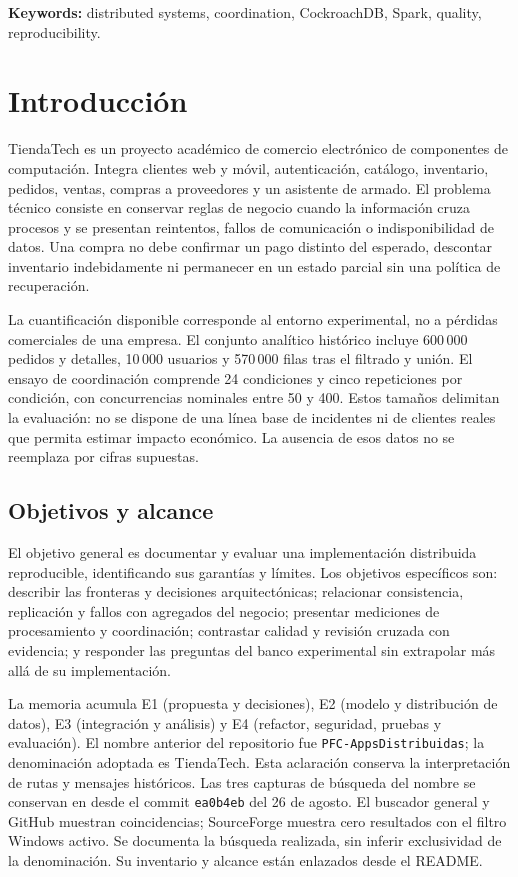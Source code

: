 \documentclass[12pt,a4paper]{article}
\begin{document}
\textbf{Keywords:} distributed systems, coordination, CockroachDB, Spark, quality, reproducibility.
\clearpage{}
\section{Introducción}
TiendaTech es un proyecto académico de comercio electrónico de componentes de computación. Integra clientes web y móvil, autenticación, catálogo, inventario, pedidos, ventas, compras a proveedores y un asistente de armado. El problema técnico consiste en conservar reglas de negocio cuando la información cruza procesos y se presentan reintentos, fallos de comunicación o indisponibilidad de datos. Una compra no debe confirmar un pago distinto del esperado, descontar inventario indebidamente ni permanecer en un estado parcial sin una política de recuperación.

La cuantificación disponible corresponde al entorno experimental, no a pérdidas comerciales de una empresa. El conjunto analítico histórico incluye 600\,000 pedidos y detalles, 10\,000 usuarios y 570\,000 filas tras el filtrado y unión. El ensayo de coordinación comprende 24 condiciones y cinco repeticiones por condición, con concurrencias nominales entre 50 y 400. Estos tamaños delimitan la evaluación: no se dispone de una línea base de incidentes ni de clientes reales que permita estimar impacto económico. La ausencia de esos datos no se reemplaza por cifras supuestas.

\subsection{Objetivos y alcance}
El objetivo general es documentar y evaluar una implementación distribuida reproducible, identificando sus garantías y límites. Los objetivos específicos son: describir las fronteras y decisiones arquitectónicas; relacionar consistencia, replicación y fallos con agregados del negocio; presentar mediciones de procesamiento y coordinación; contrastar calidad y revisión cruzada con evidencia; y responder las preguntas del banco experimental sin extrapolar más allá de su implementación.

La memoria acumula E1 (propuesta y decisiones), E2 (modelo y distribución de datos), E3 (integración y análisis) y E4 (refactor, seguridad, pruebas y evaluación). El nombre anterior del repositorio fue \texttt{PFC-AppsDistribuidas}; la denominación adoptada es TiendaTech. Esta aclaración conserva la interpretación de rutas y mensajes históricos. Las tres capturas de búsqueda del nombre se conservan en  desde el commit \texttt{ea0b4eb} del 26 de agosto. El buscador general y GitHub muestran coincidencias; SourceForge muestra cero resultados con el filtro Windows activo. Se documenta la búsqueda realizada, sin inferir exclusividad de la denominación. Su inventario y alcance están enlazados desde el README.
\end{document}
